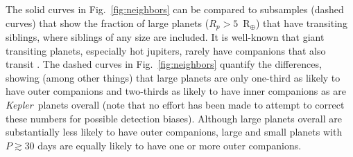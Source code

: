 \documentclass{aastex62}
\newcommand{\ik}{{\it Kepler~}}
\begin{document}
The solid curves in Fig.~\ref{fig:neighbors} can be compared to subsamples (dashed  curves) that show the fraction of large planets ($R_p > 5$~R$_\oplus$) that have transiting siblings, where siblings of any size are included.  It is well-known that giant transiting planets, especially hot jupiters, rarely have companions that also transit \citep{Latham:2011, Steffen:2012}. The dashed curves in Fig.~\ref{fig:neighbors} quantify the differences, showing (among other things) that large planets are only one-third as likely to have outer companions and two-thirds as likely to have inner companions as are \ik planets overall (note that no effort has been made to attempt to correct these numbers for possible detection biases).  Although large planets overall are substantially less likely to have outer companions, large and small planets with $P \gtrsim 30$ days are equally likely to have one or more outer companions. 



\end{document}

